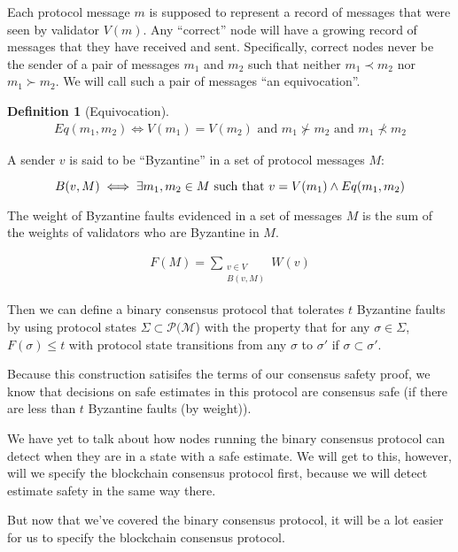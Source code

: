 \documentclass{article}
\theoremstyle{definition}
\newtheorem{defn}{Definition}[section]
\begin{document}
Each protocol message $m$ is supposed to represent a record of messages that were seen by validator $V(m)$. Any ``correct'' node will have a growing record of messages that they have received and sent. Specifically, correct nodes never be the sender of a pair of messages $m_1$ and $m_2$ such that neither $m_1 \prec m_2$ nor $m_1 \succ m_2$. We will call such a pair of messages ``an equivocation''.


\begin{defn}[Equivocation]
\begin{align}
Eq(m_1, m_2) \iff V(m_1) = V(m_2) \text{ and } m_1 \nsucc m_2 \text{ and } m_1 \nprec m_2
\end{align}
\end{defn}

A sender $v$ is said to be ``Byzantine'' in a set of protocol messages $M$:

$$
B(v,M) \iff \exists m_1, m_2 \in M \text{ such that } \\ v = V(m_1) \land Eq(m_1, m_2)
$$

The weight of Byzantine faults evidenced in a set of messages $M$ is the sum of the weights of validators who are Byzantine in $M$.

\begin{align}
F(M) = \sum_{\substack{v \in V \\ B(v, M)}} W(v)
\end{align}

Then we can define a binary consensus protocol that tolerates $t$ Byzantine faults by using protocol states $\Sigma \subset \mathcal{P}(\mathcal{M}$) with the property that for any $\sigma \in \Sigma$, $F(\sigma) \leq t$ with protocol state transitions from any $\sigma$ to $\sigma'$ if $\sigma \subset \sigma'$. 

Because this construction satisifes the terms of our consensus safety proof, we know that decisions on safe estimates in this protocol are consensus safe (if there are less than $t$ Byzantine faults (by weight)). 

We have yet to talk about how nodes running the binary consensus protocol can detect when they are in a state with a safe estimate. We will get to this, however, will we specify the blockchain consensus protocol first, because we will detect estimate safety in the same way there.

But now that we've covered the binary consensus protocol, it will be a lot easier for us to specify the blockchain consensus protocol.
\end{document}
